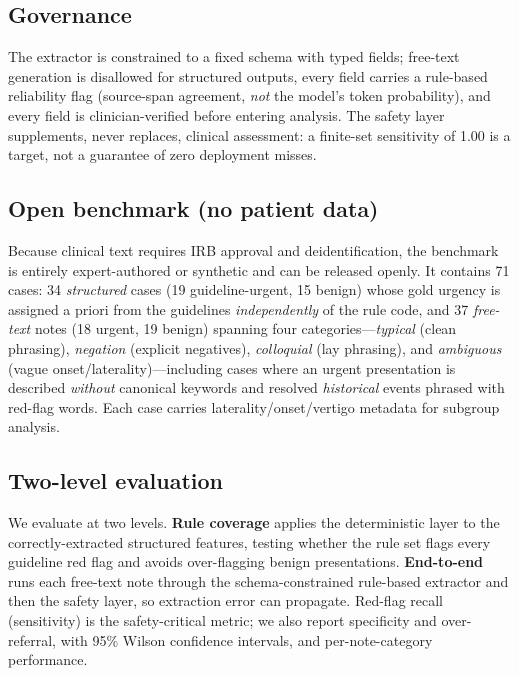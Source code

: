 \documentclass[11pt]{article}
\begin{document}
\subsection{Governance}
The extractor is constrained to a fixed schema with typed fields; free-text generation is disallowed for structured outputs, every field carries a rule-based reliability flag (source-span agreement, \emph{not} the model's token probability), and every field is clinician-verified before entering analysis. The safety layer supplements, never replaces, clinical assessment: a finite-set sensitivity of 1.00 is a target, not a guarantee of zero deployment misses.

\subsection{Open benchmark (no patient data)}
Because clinical text requires IRB approval and deidentification, the benchmark is entirely expert-authored or synthetic and can be released openly. It contains 71 cases: 34 \emph{structured} cases (19 guideline-urgent, 15 benign) whose gold urgency is assigned a priori from the guidelines \emph{independently} of the rule code, and 37 \emph{free-text} notes (18 urgent, 19 benign) spanning four categories---\emph{typical} (clean phrasing), \emph{negation} (explicit negatives), \emph{colloquial} (lay phrasing), and \emph{ambiguous} (vague onset/laterality)---including cases where an urgent presentation is described \emph{without} canonical keywords and resolved \emph{historical} events phrased with red-flag words. Each case carries laterality/onset/vertigo metadata for subgroup analysis.

\subsection{Two-level evaluation}
We evaluate at two levels. \textbf{Rule coverage} applies the deterministic layer to the correctly-extracted structured features, testing whether the rule set flags every guideline red flag and avoids over-flagging benign presentations. \textbf{End-to-end} runs each free-text note through the schema-constrained rule-based extractor and then the safety layer, so extraction error can propagate. Red-flag recall (sensitivity) is the safety-critical metric; we also report specificity and over-referral, with 95\% Wilson confidence intervals, and per-note-category performance.
\end{document}
